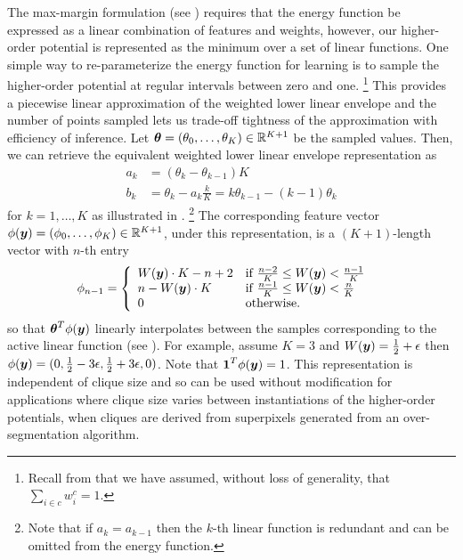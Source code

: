 \documentclass[10pt,journal,letterpaper,compsoc]{IEEEtran}
\begin{document}
The max-margin formulation (see ) requires
that the energy function be expressed as a linear combination of
features and weights, however, our higher-order potential is
represented as the minimum over a set of linear functions. One simple
way to re-parameterize the energy function for learning is to sample
the higher-order potential at regular intervals between zero and one.%
%
\footnote{Recall from  that we have assumed,
  without loss of generality, that $\sum_{i \in c} w^c_i = 1$.}
%
This provides a piecewise linear approximation of the weighted lower
linear envelope and the number of points sampled lets us trade-off
tightness of the approximation with efficiency of inference. Let
$\boldsymbol{\theta} = (\theta_0, \ldots, \theta_K) \in \mathbb{R}^{K+1}$ be the
sampled values. Then, we can retrieve the equivalent weighted lower
linear envelope representation as
%
\begin{align}
  a_k &= (\theta_k - \theta_{k-1})K\\
  b_k &= \theta_k - a_k \frac{k}{K} = k \theta_{k-1} - (k - 1) \theta_k
\end{align}
for $k = 1, \ldots, K$ as illustrated in .%
\footnote{Note that if $a_k = a_{k-1}$ then the $k$-th linear function
  is redundant and can be omitted from the energy function.}
%
The corresponding feature vector $\phi({\boldsymbol{y}}) = \left(\phi_0, \ldots,
\phi_{K}\right) \in \mathbb{R}^{K+1}$, under this representation, is a
$(K+1)$-length vector with $n$-th entry
%
\begin{align}
  \phi_{n-1} &= \left\{ \begin{array}{ll}
    W(\by) \cdot K - n + 2
    & \textrm{if $\frac{n - 2}{K} \leq W(\by) < \frac{n - 1}{K}$} 
    \\
    n - W(\by) \cdot K
    & \textrm{if $\frac{n - 1}{K} \leq W(\by) < \frac{n}{K}$} 
    \\
    0 & \textrm{otherwise}.
  \end{array} \right.
  \label{eqn:features}
\end{align}
%
so that $\boldsymbol{\theta}^T \phi({\boldsymbol{y}})$ linearly interpolates between the
samples corresponding to the active linear function (see
). For example, assume $K = 3$ and $W({\boldsymbol{y}}) =
\frac{1}{2} + \epsilon$ then $\phi({\boldsymbol{y}}) = (0, \frac{1}{2} - 3
\epsilon, \frac{1}{2} + 3 \epsilon, 0)$. Note that $\textbf{1}^T \phi({\boldsymbol{y}})
= 1$. This representation is independent of clique size and so can be
used without modification for applications where clique size varies
between instantiations of the higher-order potentials, \eg when
cliques are derived from superpixels generated from an
over-segmentation algorithm.
\end{document}
